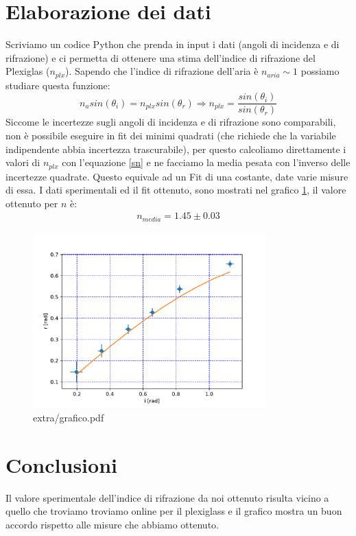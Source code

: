 \documentclass{article}
\begin{document}
\section{Elaborazione dei dati}
    Scriviamo un codice Python che prenda in input i dati (angoli di incidenza e di rifrazione) e ci permetta di ottenere una stima dell'indice di rifrazione del Plexiglas ($n_{plx}$).
    Sapendo che l'indice di rifrazione dell'aria è $n_{aria} \sim 1$ possiamo studiare questa funzione:
    \begin{equation}\label{sn}
        n_a sin(\theta_i) = n_{plx} sin(\theta_r) \Rightarrow n_{plx} = \frac{sin(\theta_i)}{sin(\theta_r)}
    \end{equation}
    Siccome le incertezze sugli angoli di incidenza e di rifrazione sono comparabili, non è possibile eseguire in fit dei minimi quadrati (che richiede che la variabile indipendente abbia incertezza trascurabile), per questo calcoliamo direttamente i valori di $n_{plx}$ con l'equazione \ref{sn} e ne facciamo la media pesata con l'inverso delle incertezze quadrate. Questo equivale ad un Fit di una costante, date varie misure di essa.
    I dati sperimentali ed il fit ottenuto, sono mostrati nel grafico \ref{grafico}, il valore ottenuto per $n$ è:
    \begin{gather*}
        n_{media} = 1.45 \pm 0.03
    \end{gather*}
    \begin{figure}[ht!]
        \centering
        \includegraphics[width=0.8\textwidth]{extra/grafico.pdf}
        \caption{extra/grafico.pdf}
        \label{grafico}
    \end{figure}



\section{Conclusioni}
    Il valore sperimentale dell'indice di rifrazione da noi ottenuto risulta vicino
    a quello che troviamo troviamo online per il plexiglass e il grafico mostra un
    buon accordo rispetto alle misure che abbiamo ottenuto.
\end{document}
